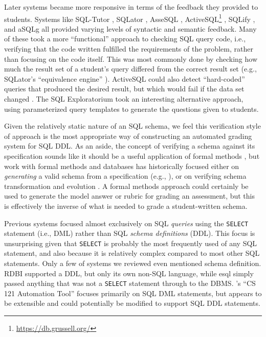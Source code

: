 \documentclass[sigconf, review, anonymous, capitalise]{acmart}
\begin{document}
Later systems became more responsive in terms of the feedback they provided to students. Systems like SQL-Tutor \cite{Mitrovic.A-1998a-Learning}, SQLator \cite{Sadiq.S-2004a-SQLator}, AsseSQL \cite{Prior.J-2004a-Backwash}, ActiveSQL\footnote{\url{https://db.grussell.org/}} \cite{Russell.G-2004a-Improving,Russell.G-2005a-Online}, SQLify \cite{Dekeyser.S-2007a-Computer}, and aSQLg \cite{Kleiner.C-2013a-Automated} all provided varying levels of syntactic and semantic feedback. Many of these took a more ``functional'' approach to checking SQL query code, i.e., verifying that the code written fulfilled the requirements of the problem, rather than focusing on the code itself. This was most commonly done by checking how much the result set of a student's query differed from the correct result set (e.g., SQLator's ``equivalence engine'' \cite{Sadiq.S-2004a-SQLator}). ActiveSQL could also detect ``hard-coded'' queries that produced the desired result, but which would fail if the data set changed \cite{Russell.G-2005a-Online}. The SQL Exploratorium \cite{Brusilovsky.P-2010a-Learning} took an interesting alternative approach, using parameterized query templates to generate the questions given to students.

Given the relatively static nature of an SQL schema, we feel this verification style of approach is the most appropriate way of constructing an automated grading system for SQL DDL. As an aside, the concept of verifying a schema against its specification sounds like it should be a useful application of formal methods \cite{Spivey.J-1989a-An-introduction}, but work with formal methods and databases has historically focused either on \emph{generating} a valid schema from a specification (e.g., \cite{Vatanawood.W-2004a-Formal,Lukovic.I-2003a-Proceedings,Choppella.V-2006a-Constructing}), or on verifying schema transformation and evolution \cite{Bench-Capon.T-1998a-Report}. A formal methods approach could certainly be used to generate the model answer or rubric for grading an assessment, but this is effectively the inverse of what is needed to grade a student-written schema.

Previous systems focused almost exclusively on SQL \emph{queries} using the \texttt{SELECT} statement (i.e., DML) rather than SQL \emph{schema definitions} (DDL). This focus is unsurprising given that \texttt{SELECT} is probably the most frequently used of any SQL statement, and also because it is relatively complex compared to most other SQL statements. Only a few of systems we reviewed even mentioned schema definition. RDBI \cite{Dietrich.S-1993a-An-educational} supported a DDL, but only its own non-SQL language, while esql \cite{Kearns.R-1997a-A-teaching} simply passed anything that was not a \texttt{SELECT} statement through to the DBMS. \citeauthor{Gong.A-2015a-CS-121-Automation}'s ``CS 121 Automation Tool'' \cite{Gong.A-2015a-CS-121-Automation} focuses primarily on SQL DML statements, but appears to be extensible and could potentially be modified to support SQL DDL statements.
\end{document}
